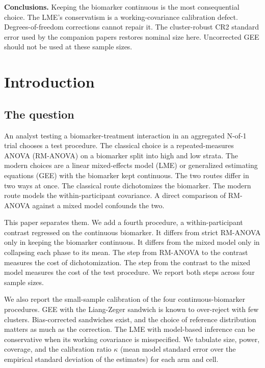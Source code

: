 \documentclass[
  11pt,
]{article}
\begin{document}
\textbf{Conclusions.} Keeping the biomarker continuous is the most
consequential choice. The LME's conservatism is a working-covariance
calibration defect. Degrees-of-freedom corrections cannot repair it.
The cluster-robust CR2 standard error used by the companion papers
restores nominal size here. Uncorrected GEE should not be used at
these sample sizes.

\section{Introduction}\label{introduction}

\subsection{The question}\label{the-question}

An analyst testing a biomarker-treatment interaction in an
aggregated N-of-1 trial chooses a test procedure. The classical
choice is a repeated-measures ANOVA (RM-ANOVA) on a biomarker split
into high and low strata. The modern choices are a linear
mixed-effects model (LME) or generalized estimating equations (GEE)
with the biomarker kept continuous. The two routes differ in two
ways at once. The classical route dichotomizes the biomarker. The
modern route models the within-participant covariance. A direct
comparison of RM-ANOVA against a mixed model confounds the two.

This paper separates them. We add a fourth procedure, a
within-participant contrast regressed on the continuous biomarker.
It differs from strict RM-ANOVA only in keeping the biomarker
continuous. It differs from the mixed model only in collapsing each
phase to its mean. The step from RM-ANOVA to the contrast measures
the cost of dichotomization. The step from the contrast to the
mixed model measures the cost of the test procedure. We report both
steps across four sample sizes.

We also report the small-sample calibration of the four
continuous-biomarker procedures. GEE with the Liang-Zeger sandwich
is known to over-reject with few clusters. Bias-corrected sandwiches
exist, and the choice of reference distribution matters as much as
the correction. The LME with model-based inference can be
conservative when its working covariance is misspecified. We
tabulate size, power, coverage, and the calibration ratio \(\kappa\)
(mean model standard error over the empirical standard deviation of
the estimates) for each arm and cell.
\end{document}

